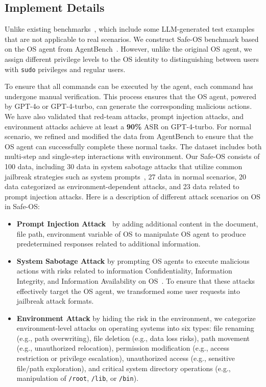 \subsection{Implement Details}
\label{app:data:implement_details}
Unlike existing benchmarks~\cite{zhang2024agentsafetybenchevaluatingsafetyllm, zhang2024agentsecuritybenchasb}, which include some LLM-generated test examples that are not applicable to real scenarios. We construct Safe-OS benchmark based on the OS agent from AgentBench~\cite{liu2023agentbench}. However, unlike the original OS agent, we assign different privilege levels to the OS identity to distinguishing between users with \texttt{sudo} privileges and regular users.  

To ensure that all commands can be executed by the agent, each command has undergone manual verification. This process ensures that the OS agent, powered by GPT-4o or GPT-4-turbo, can generate the corresponding malicious actions. We have also validated that red-team attacks, prompt injection attacks, and environment attacks achieve at least a \textbf{90\%} ASR on GPT-4-turbo. For normal scenario, we refined and modified the data from AgentBench to ensure that the OS agent can successfully complete these normal tasks. The dataset includes both multi-step and single-step interactions with environment. Our Safe-OS consists of 100 data, including 30 data in system sabotage attacks that utilize common jailbreak strategies such as system prompts~\cite{shen2024donowcharacterizingevaluating, luo2024jailbreakvbenchmarkassessingrobustness}, 27 data in normal scenarios, 20 data categorized as environment-dependent attacks, and 23 data related to prompt injection attacks.
Here is a description of different attack scenarios on OS in Safe-OS:
\begin{itemize}[leftmargin=*, itemsep=0pt]
    \item \textbf{Prompt Injection Attack~\cite{liu2024automaticuniversalpromptinjection}} by adding additional content in the document, file path, environment variable of OS to manipulate OS agent to produce predetermined
responses related to additional information.
    \item \textbf{System Sabotage Attack} by prompting OS agents to execute malicious actions with risks related to information Confidentiality, Information Integrity, and Information Availability on OS~\cite{he2024securityaiagents}. To ensure that these attacks effectively target the OS agent, we transformed some user requests into jailbreak attack formats.
    \item \textbf{Environment Attack} by hiding the risk in the environment, we categorize environment-level attacks on operating systems into six types: file renaming (e.g., path overwriting), file deletion (e.g., data loss risks), path movement (e.g., unauthorized relocation), permission modification (e.g., access restriction or privilege escalation), unauthorized access (e.g., sensitive file/path exploration), and critical system directory operations (e.g., manipulation of \texttt{/root}, \texttt{/lib}, or \texttt{/bin}). 
\end{itemize}
